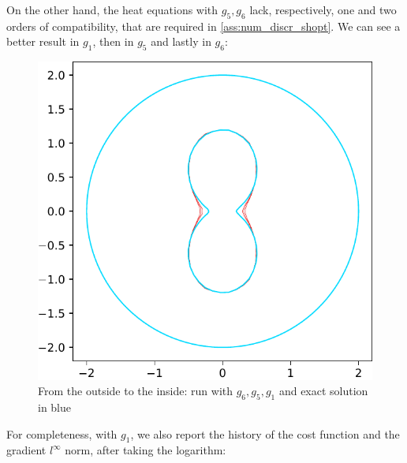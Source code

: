 \documentclass[english,a4paper,10pt,oneside]{scrbook}	%
\theoremstyle{break}
\theoremstyle{remark}
\begin{document}
On the other hand, the heat equations with $g_5,g_6$ lack, respectively, one and two orders of compatibility, that are required in \cref{ass:num_discr_shopt}. We can see a better result in $g_1$, then in $g_5$ and lastly in $g_6$:

\begin{figure}[H]
\centering
\includegraphics[width=0.45\columnwidth]{Images/hourglass_constant_1_2_cropped.pdf}
\caption{From the outside to the inside: run with $g_6, g_5, g_1$ and exact solution in blue}\label{fig:comparison_compatibility}
\end{figure}




For completeness, with $g_1$, we also report the history of the cost function and the gradient $l^\infty$ norm, after taking the logarithm:
\end{document}
